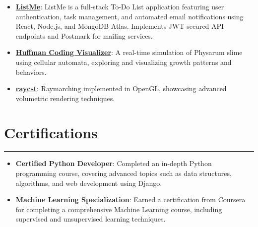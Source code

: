 \documentclass[a4paper,10pt]{article}
\begin{document}
\begin{itemize}
    \item \textbf{\href{https://github.com/thearfa99/mern}{ListMe}}: ListMe is a full-stack To-Do List application featuring user authentication, task management, and automated email notifications using React, Node.js, and MongoDB Atlas. Implements JWT-secured API endpoints and Postmark for mailing services.
    \item \textbf{\href{https://github.com/thearfa99/huft}{Huffman Coding Visualizer}}: A real-time simulation of Physarum slime using cellular automata, exploring and visualizing growth patterns and behaviors.
    \item \textbf{\href{https://github.com/neb0lle/raycst.git}{raycst}}: Raymarching implemented in OpenGL, showcasing advanced volumetric rendering techniques.
\end{itemize}

\section*{Certifications}
\hrule
\vspace{0.5em}

\begin{itemize}
    \item \textbf{Certified Python Developer}: Completed an in-depth Python programming course, covering advanced topics such as data structures, algorithms, and web development using Django.
    \item \textbf{Machine Learning Specialization}: Earned a certification from Coursera for completing a comprehensive Machine Learning course, including supervised and unsupervised learning techniques.
\end{itemize}
\end{document}

